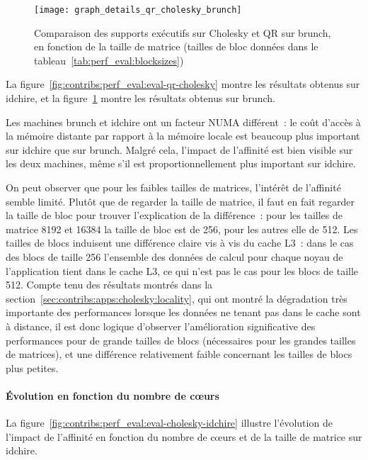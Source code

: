 \begin{figure}[h!]
  \centering
  \texttt{[image: graph\_details\_qr\_cholesky\_brunch]}
  \caption{Comparaison des supports exécutifs sur Cholesky et QR sur brunch, en fonction de la taille de matrice (tailles de bloc données dans le tableau~\ref{tab:perf_eval:blocksizes})}\label{fig:contribs:perf_eval:eval-qr-cholesky-brunch}
\end{figure}

La figure~\ref{fig:contribs:perf_eval:eval-qr-cholesky} montre les résultats obtenus sur idchire, et la figure~\ref{fig:contribs:perf_eval:eval-qr-cholesky-brunch} montre les résultats obtenus sur brunch.


Les machines brunch et idchire ont un facteur NUMA différent~: le coût d'accès à la mémoire distante par rapport à la mémoire locale est beaucoup plus important sur idchire que sur brunch.
Malgré cela, l'impact de l'affinité est bien visible sur les deux machines, même s'il est proportionnellement plus important sur idchire.

On peut observer que pour les faibles tailles de matrices, l'intérêt de l'affinité semble limité.
Plutôt que de regarder la taille de matrice, il faut en fait regarder la taille de bloc pour trouver l'explication de la différence~: pour les tailles de matrice 8192 et 16384 la taille de bloc est de 256, pour les autres elle de 512.
Les tailles de blocs induisent une différence claire vis à vis du cache L3~: dans le cas des blocs de taille 256 l'ensemble des données de calcul pour chaque noyau de l'application tient dans le cache L3, ce qui n'est pas le cas pour les blocs de taille 512.
Compte tenu des résultats montrés dans la section~\ref{sec:contribs:apps:cholesky:locality}, qui ont montré la dégradation très importante des performances lorsque les données ne tenant pas dans le cache sont à distance, il est donc logique d'observer l'amélioration significative des performances pour de grande tailles de blocs (nécessaires pour les grandes tailles de matrices), et une différence relativement faible concernant les tailles de blocs plus petites.


\paragraph{Évolution en fonction du nombre de cœurs}

La figure~\ref{fig:contribs:perf_eval:eval-cholesky-idchire} illustre l'évolution de l'impact de l'affinité en fonction du nombre de cœurs et de la taille de matrice sur idchire.



